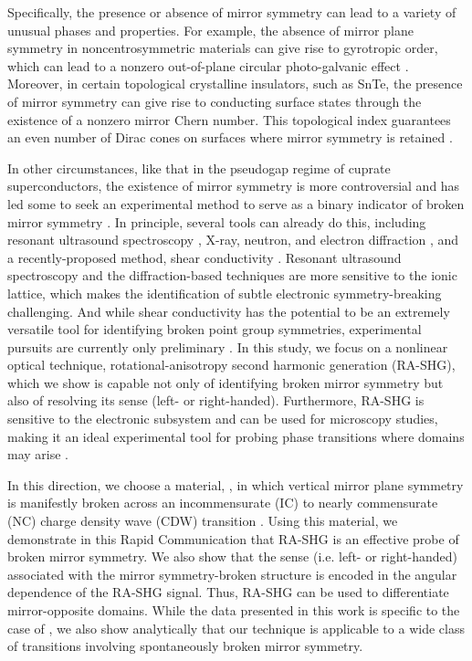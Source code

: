 Specifically, the presence or absence of mirror symmetry can lead to a variety of unusual phases and properties.
For example, the absence of mirror plane symmetry in noncentrosymmetric materials can give rise to gyrotropic order, which can lead to a nonzero out-of-plane circular photo-galvanic effect \cite{belinicher1980}.
Moreover, in certain topological crystalline insulators, such as SnTe, the presence of mirror symmetry can give rise to conducting surface states through the existence of a nonzero mirror Chern number.
This topological index guarantees an even number of Dirac cones on surfaces where mirror symmetry is retained \cite{teo2008, hsieh_topological_2012, fu_topological_2011}.

In other circumstances, like that in the pseudogap regime of cuprate superconductors, the existence of mirror symmetry is more controversial and has led some to seek an experimental method to serve as a binary indicator of broken mirror symmetry \cite{hlobil_elastoconductivity_2015}.
In principle, several tools can already do this, including resonant ultrasound spectroscopy \cite{leisure1997, migliori1993}, X-ray, neutron, and electron diffraction \cite{bacon1966, dorset2013}, and a recently-proposed method, shear conductivity \cite{hlobil_elastoconductivity_2015}.
Resonant ultrasound spectroscopy and the diffraction-based techniques are more sensitive to the ionic lattice, which makes the identification of subtle electronic symmetry-breaking challenging.
And while shear conductivity has the potential to be an extremely versatile tool for identifying broken point group symmetries, experimental pursuits are currently only preliminary \cite{hlobil_elastoconductivity_2015}.
In this study, we focus on a nonlinear optical technique, rotational-anisotropy second harmonic generation (RA-SHG), which we show is capable not only of identifying broken mirror symmetry \cite{heinz_study_1985} but also of resolving its sense (left- or right-handed).
Furthermore, RA-SHG is sensitive to the electronic subsystem and can be used for microscopy studies, making it an ideal experimental tool for probing phase transitions where domains may arise \cite{kumar_magnetic_2017, harter_parity-breaking_2017}.

In this direction, we choose a material, \tastwo, in which vertical mirror plane symmetry is manifestly broken across an incommensurate (IC) to nearly commensurate (NC) charge density wave (CDW) transition \cite{wilson_charge-density_1975, zong_ultrafast_2018}.
Using this material, we demonstrate in this Rapid Communication that RA-SHG is an effective probe of broken mirror symmetry.
We also show that the sense (i.e. left- or right-handed) associated with the mirror symmetry-broken structure is encoded in the angular dependence of the RA-SHG signal.
Thus, RA-SHG can be used to differentiate mirror-opposite domains. 
While the data presented in this work is specific to the case of \tastwo, we also show analytically that our technique is applicable to a wide class of transitions involving spontaneously broken mirror symmetry.

